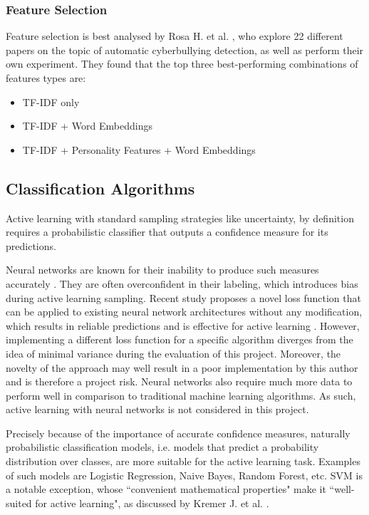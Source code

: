 \documentclass[a4paper,12pt]{article}
\begin{document}
\subsubsection{Feature Selection}
Feature selection is best analysed by Rosa H. et al. \cite{Rosa2019}, who explore 22 different papers on the topic of automatic cyberbullying detection, as well as perform their own experiment. They found that the top three best-performing combinations of features types are:
\begin{itemize}
    \item TF-IDF only
    \item TF-IDF + Word Embeddings
    \item TF-IDF + Personality Features + Word Embeddings
\end{itemize}
\subsection{Classification Algorithms}
Active learning with standard sampling strategies like uncertainty, by definition requires a probabilistic classifier that outputs a confidence measure for its predictions.

Neural networks are known for their inability to produce such measures accurately \cite{Nguyen2015}. They are often overconfident in their labeling, which introduces bias during active learning sampling.
Recent study proposes a novel loss function that can be applied to existing neural network architectures without any modification, which results in reliable predictions and is effective for active learning \cite{Moon2020}. However, implementing a different loss function for a specific algorithm diverges from the idea of minimal variance during the evaluation of this project. Moreover, the novelty of the approach may well result in a poor implementation by this author and is therefore a project risk. Neural networks also require much more data to perform well in comparison to traditional machine learning algorithms. As such, active learning with neural networks is not considered in this project.

Precisely because of the importance of accurate confidence measures, naturally probabilistic classification models, i.e. models that predict a probability distribution over classes, are more suitable for the active learning task. Examples of such models are Logistic Regression, Naive Bayes, Random Forest, etc. SVM is a notable exception, whose ``convenient mathematical properties" make it ``well-suited for active learning", as discussed by Kremer J. et al. \cite{Kremer2014}.
\end{document}
